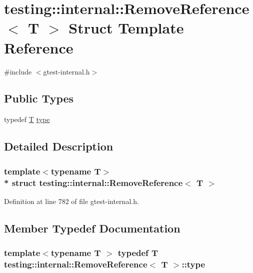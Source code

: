 \hypertarget{structtesting_1_1internal_1_1_remove_reference}{}\section{testing\+:\+:internal\+:\+:Remove\+Reference$<$ T $>$ Struct Template Reference}
\label{structtesting_1_1internal_1_1_remove_reference}


{\ttfamily \#include $<$gtest-\/internal.\+h$>$}

\subsection*{Public Types}
\begin{DoxyCompactItemize}
\item 
typedef \hyperlink{functions__7_8js_adf1f3edb9115acb0a1e04209b7a9937b}{T} \hyperlink{structtesting_1_1internal_1_1_remove_reference_a9ca4f6499579225f7986b789ee4b2895}{type}
\end{DoxyCompactItemize}


\subsection{Detailed Description}
\subsubsection*{template$<$typename T$>$\\*
struct testing\+::internal\+::\+Remove\+Reference$<$ T $>$}



Definition at line 782 of file gtest-\/internal.\+h.



\subsection{Member Typedef Documentation}
\subsubsection[{\texorpdfstring{type}{type}}]{\setlength{\rightskip}{0pt plus 5cm}template$<$typename T $>$ typedef {\bf T} {\bf testing\+::internal\+::\+Remove\+Reference}$<$ {\bf T} $>$\+::{\bf type}}\hypertarget{structtesting_1_1internal_1_1_remove_reference_a9ca4f6499579225f7986b789ee4b2895}{}\label{structtesting_1_1internal_1_1_remove_reference_a9ca4f6499579225f7986b789ee4b2895}


